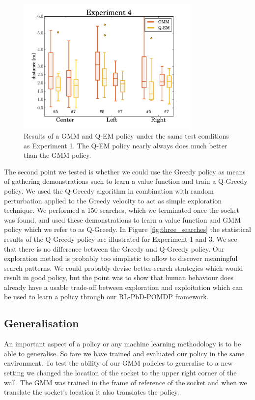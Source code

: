 \begin{figure}
 \centering
 \includegraphics[width=0.8\textwidth]{./ch4-PiH/Figures/Results1/experiment4/experiment4.pdf}
 \caption{Results of a GMM and Q-EM policy under the same test conditions as Experiment 1. The Q-EM policy nearly always does much better than the GMM policy.}
 \label{fig:experiment4_stats}
\end{figure}

The second point we tested is whether we could use the Greedy policy as means of gathering demonstrations such to learn a value function and 
train a Q-Greedy policy. We used the Q-Greedy algorithm in combination with random perturbation applied to the Greedy velocity to act as 
simple exploration technique. We performed a 150 searches, which we terminated once the socket was found, and used these demonstrations to 
learn a value function and GMM policy which we refer to as Q-Greedy. In Figure \ref{fig:three_searches} the statistical results 
of the Q-Greedy policy are illustrated for Experiment 1 and 3. We see that there is no difference between the Greedy and Q-Greedy policy. 
Our exploration method is probably too simplistic to allow to discover meaningful search patterns. We could probably devise better 
search strategies which would result in good policy, but the point was to show that human behaviour does already have a usable trade-off 
between exploration and exploitation which can be used to learn a policy through our RL-PbD-POMDP framework.

\subsection{Generalisation}

An important aspect of a policy or any machine learning methodology is to be able to generalise. So fare we have trained and 
evaluated our policy in the same environment. To test the ability of our GMM policies to generalise to a new setting we changed 
the location of the socket to the upper right corner of the wall. The GMM was trained in the frame of reference of the socket and
when we translate the socket's location it also translates the policy. 


